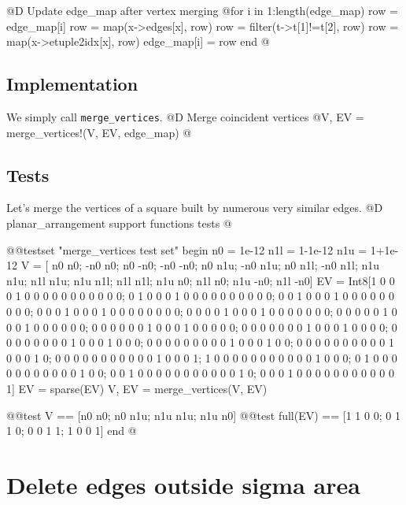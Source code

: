 @D Update edge\_map after vertex merging
@{for i in 1:length(edge_map)
    row = edge_map[i]
    row = map(x->edges[x], row)
    row = filter(t->t[1]!=t[2], row)
    row = map(x->etuple2idx[x], row)
    edge_map[i] = row
end
@}


\subsection{Implementation}
We simply call \texttt{merge\_vertices}.
@D Merge coincident vertices
@{V, EV = merge_vertices!(V, EV, edge_map)
@}
\subsection{Tests}
Let's merge the vertices of a square built by numerous
very similar edges.
@D planar\_arrangement support functions tests
@{@@testset "merge_vertices test set" begin
    n0 = 1e-12
    n1l = 1-1e-12
    n1u = 1+1e-12
    V = [ n0  n0; -n0  n0;  n0 -n0; -n0 -n0;
          n0 n1u; -n0 n1u;  n0 n1l; -n0 n1l;
         n1u n1u; n1l n1u; n1u n1l; n1l n1l;
         n1u  n0; n1l  n0; n1u -n0; n1l -n0]
    EV = Int8[1 0 0 0 1 0 0 0 0 0 0 0 0 0 0 0;
              0 1 0 0 0 1 0 0 0 0 0 0 0 0 0 0;
              0 0 1 0 0 0 1 0 0 0 0 0 0 0 0 0;
              0 0 0 1 0 0 0 1 0 0 0 0 0 0 0 0;
              0 0 0 0 1 0 0 0 1 0 0 0 0 0 0 0;
              0 0 0 0 0 1 0 0 0 1 0 0 0 0 0 0;
              0 0 0 0 0 0 1 0 0 0 1 0 0 0 0 0;
              0 0 0 0 0 0 0 1 0 0 0 1 0 0 0 0;
              0 0 0 0 0 0 0 0 1 0 0 0 1 0 0 0;
              0 0 0 0 0 0 0 0 0 1 0 0 0 1 0 0;
              0 0 0 0 0 0 0 0 0 0 1 0 0 0 1 0;
              0 0 0 0 0 0 0 0 0 0 0 1 0 0 0 1;
              1 0 0 0 0 0 0 0 0 0 0 0 1 0 0 0;
              0 1 0 0 0 0 0 0 0 0 0 0 0 1 0 0;
              0 0 1 0 0 0 0 0 0 0 0 0 0 0 1 0;
              0 0 0 1 0 0 0 0 0 0 0 0 0 0 0 1]
    EV = sparse(EV)
    V, EV = merge_vertices(V, EV)

    @@test V == [n0 n0; n0 n1u; n1u n1u; n1u n0]
    @@test full(EV) == [1 1 0 0;
                       0 1 1 0;
                       0 0 1 1;
                       1 0 0 1]
end
@}



\section{Delete edges outside sigma area}

